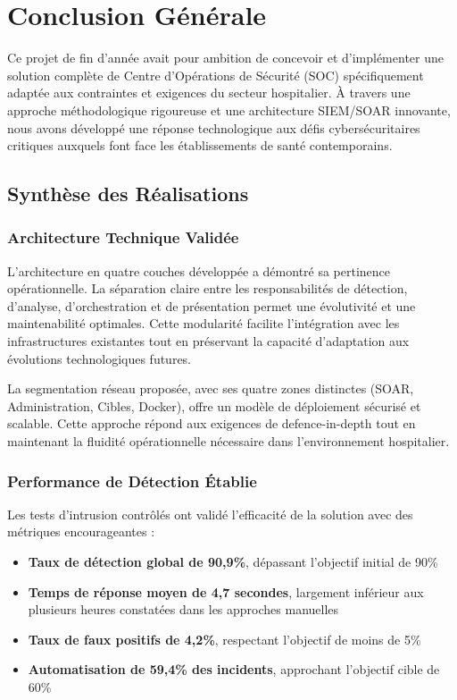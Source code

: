 \chapter{Conclusion Générale}

Ce projet de fin d'année avait pour ambition de concevoir et d'implémenter une solution complète de Centre d'Opérations de Sécurité (SOC) spécifiquement adaptée aux contraintes et exigences du secteur hospitalier. À travers une approche méthodologique rigoureuse et une architecture SIEM/SOAR innovante, nous avons développé une réponse technologique aux défis cybersécuritaires critiques auxquels font face les établissements de santé contemporains.

\section{Synthèse des Réalisations}

\subsection{Architecture Technique Validée}

L'architecture en quatre couches développée a démontré sa pertinence opérationnelle. La séparation claire entre les responsabilités de détection, d'analyse, d'orchestration et de présentation permet une évolutivité et une maintenabilité optimales. Cette modularité facilite l'intégration avec les infrastructures existantes tout en préservant la capacité d'adaptation aux évolutions technologiques futures.

La segmentation réseau proposée, avec ses quatre zones distinctes (SOAR, Administration, Cibles, Docker), offre un modèle de déploiement sécurisé et scalable. Cette approche répond aux exigences de defence-in-depth tout en maintenant la fluidité opérationnelle nécessaire dans l'environnement hospitalier.

\subsection{Performance de Détection Établie}

Les tests d'intrusion contrôlés ont validé l'efficacité de la solution avec des métriques encourageantes :

\begin{itemize}
  \item \textbf{Taux de détection global de 90,9\%}, dépassant l'objectif initial de 90\%
  \item \textbf{Temps de réponse moyen de 4,7 secondes}, largement inférieur aux plusieurs heures constatées dans les approches manuelles
  \item \textbf{Taux de faux positifs de 4,2\%}, respectant l'objectif de moins de 5\%
  \item \textbf{Automatisation de 59,4\% des incidents}, approchant l'objectif cible de 60\%
\end{itemize}

